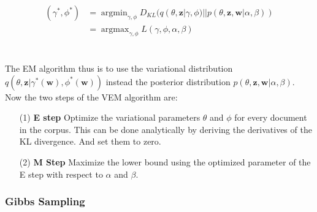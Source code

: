 \documentclass[11pt,a4paper]{article}
\DeclareMathOperator*{\argmin}{argmin}
\DeclareMathOperator*{\argmax}{argmax}
\begin{document}
\begin{align}
(\gamma^*, \phi^*) &= \argmin_{\gamma, \phi}D_{KL}(q(\theta,\textbf{z}|\gamma,\phi)||p(\theta,\textbf{z},\textbf{w}|\alpha,\beta))\\
&= \argmax_{\gamma, \phi} L(\gamma,\phi,\alpha, \beta)
\end{align}\\
\\
The EM algorithm thus is to use the variational distribution $q(\theta,\textbf{z}|\gamma^*(\textbf{w}), \phi^*(\textbf{w}))$ instead the posterior distribution $p(\theta,\textbf{z},\textbf{w}|\alpha,\beta)$. Now the two steps of the VEM algorithm are:
\begin{itemize}
	\item [(1)]\textbf{E step} Optimize the variational parameters $\theta$ and $\phi$ for every document in the corpus. This can be done analytically by deriving the derivatives of the KL divergence. And set them to zero.
	\item [(2)] \textbf{M Step} Maximize the lower bound using the optimized parameter of the E step with respect to $\alpha$ and $\beta$.
\end{itemize}


\subsubsection{Gibbs Sampling}
\end{document}
